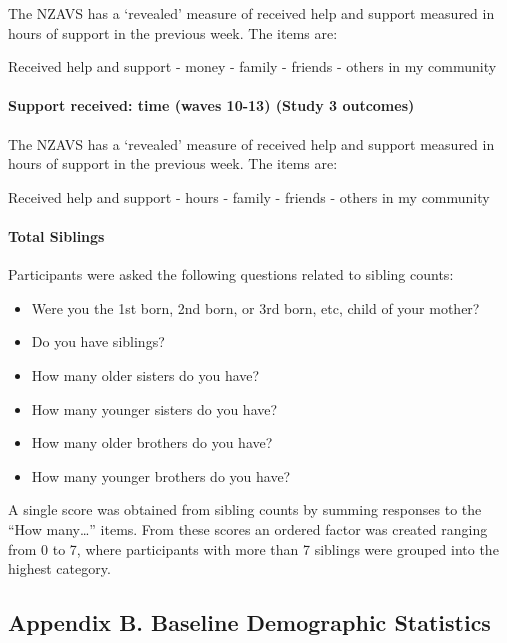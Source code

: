 \documentclass[
  single column]{article}
\let\oldparagraph\paragraph
\renewcommand{\paragraph}[1]{\oldparagraph{#1}\mbox{}}
\providecommand{\tightlist}{%
  \setlength{\itemsep}{0pt}\setlength{\parskip}{0pt}}\usepackage{longtable,booktabs,array}
\begin{document}
The NZAVS has a `revealed' measure of received help and support measured
in hours of support in the previous week. The items are:

Received help and support - money - family - friends - others in my
community

\paragraph{Support received: time (waves 10-13) (Study 3
outcomes)}\label{support-received-time-waves-10-13-study-3-outcomes}

The NZAVS has a `revealed' measure of received help and support measured
in hours of support in the previous week. The items are:

Received help and support - hours - family - friends - others in my
community

\paragraph{Total Siblings}\label{total-siblings}

Participants were asked the following questions related to sibling
counts:

\begin{itemize}
\tightlist
\item
  Were you the 1st born, 2nd born, or 3rd born, etc, child of your
  mother?
\item
  Do you have siblings?
\item
  How many older sisters do you have?
\item
  How many younger sisters do you have?
\item
  How many older brothers do you have?
\item
  How many younger brothers do you have?
\end{itemize}

A single score was obtained from sibling counts by summing responses to
the ``How many\ldots{}'' items. From these scores an ordered factor was
created ranging from 0 to 7, where participants with more than 7
siblings were grouped into the highest category.

\subsection{Appendix B. Baseline Demographic
Statistics}\label{appendix-demographics}

\begin{table}

\caption{\label{tbl-B}}

\centering{

\captionsetup{labelsep=none}

}

\end{table}%
\end{document}
